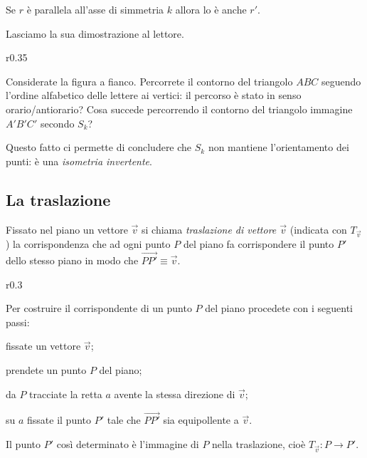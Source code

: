 \begin{teorema}\label{teo:8.5}
Se $r$ è parallela all'asse di simmetria $k$ allora lo è anche $r'$.
\end{teorema}

Lasciamo la sua dimostrazione al lettore.

\setlength{\intextsep}{3pt plus 2.0pt minus 2.0pt}
\begin{wrapfigure}{r}{0.35\textwidth}
	\centering
\end{wrapfigure}
Considerate la figura a fianco. Percorrete il contorno del triangolo 
$ABC$ seguendo l'ordine alfabetico delle lettere ai vertici: il 
percorso è stato in senso orario/antiorario? Cosa succede percorrendo 
il contorno del triangolo immagine $A'B'C'$ secondo $S_k$?

Questo fatto ci permette di concludere che $S_k$ non mantiene 
l'orientamento dei punti: è una \emph{isometria invertente}.



\subsection{La traslazione}

\begin{definizione}
Fissato nel piano un vettore $\vec{v}$ si chiama \emph{traslazione di 
vettore $\vec{v}$} (indicata con $T_{\vec{v}}$) la corrispondenza che 
ad ogni punto $P$ del piano fa corrispondere il punto $P'$ dello 
stesso piano in modo che 
$\overset{\longrightarrow}{PP'}\equiv\vec{v}$.
\end{definizione}

\setlength{\intextsep}{3pt plus 2.0pt minus 2.0pt}
\begin{wrapfigure}{r}{0.3\textwidth}
	\centering
\end{wrapfigure}
Per costruire il corrispondente di un punto $P$ del piano procedete 
con i seguenti passi:
\begin{enumerate*}
\item fissate un vettore $\vec{v}$;
\item prendete un punto $P$ del piano;
\item da $P$ tracciate la retta $a$ avente la stessa direzione di 
$\vec{v}$;
\item su $a$ fissate il punto $P'$ tale che $\overrightarrow{PP'}$ 
sia equipollente a $\vec{v}$.
\end{enumerate*}
Il punto $P'$ così determinato è l'immagine di $P$ nella traslazione, 
cioè $T_{\vec{v}}:P\rightarrow P'$.

